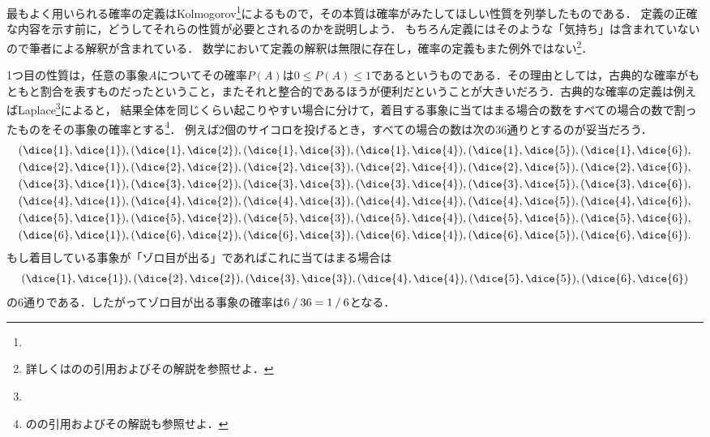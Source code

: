 \documentclass[main.tex]{subfiles}
\begin{document}
最もよく用いられる確率の定義はKolmogorov\footnote{%
}によるもので，その本質は確率がみたしてほしい性質を列挙したものである．
定義の正確な内容を示す前に，どうしてそれらの性質が必要とされるのかを説明しよう．
もちろん定義にはそのような「気持ち」は含まれていないので筆者による解釈が含まれている．
数学において定義の解釈は無限に存在し，確率の定義もまた例外ではない\footnote{%
詳しくはのの引用およびその解説を参照せよ．}．

1つ目の性質は，任意の事象\(A\)についてその確率\(P(A)\)は\(0 \leq P(A) \leq 1\)であるというものである．その理由としては，古典的な確率がもともと割合を表すものだったということ，またそれと整合的であるほうが便利だということが大きいだろう．古典的な確率の定義は例えばLaplace\footnote{%
}によると，
結果全体を同じくらい起こりやすい場合に分けて，着目する事象に当てはまる場合の数をすべての場合の数で割ったものをその事象の確率とする\footnote{%
のの引用およびその解説も参照せよ．}．
例えば2個のサイコロを投げるとき，すべての場合の数は次の36通りとするのが妥当だろう．
\begin{align*}
    & (\dice{1}, \dice{1}), (\dice{1}, \dice{2}), (\dice{1}, \dice{3}), (\dice{1}, \dice{4}), (\dice{1}, \dice{5}), (\dice{1}, \dice{6}), \\
    & (\dice{2}, \dice{1}), (\dice{2}, \dice{2}), (\dice{2}, \dice{3}), (\dice{2}, \dice{4}), (\dice{2}, \dice{5}), (\dice{2}, \dice{6}), \\
    & (\dice{3}, \dice{1}), (\dice{3}, \dice{2}), (\dice{3}, \dice{3}), (\dice{3}, \dice{4}), (\dice{3}, \dice{5}), (\dice{3}, \dice{6}), \\
    & (\dice{4}, \dice{1}), (\dice{4}, \dice{2}), (\dice{4}, \dice{3}), (\dice{4}, \dice{4}), (\dice{4}, \dice{5}), (\dice{4}, \dice{6}), \\
    & (\dice{5}, \dice{1}), (\dice{5}, \dice{2}), (\dice{5}, \dice{3}), (\dice{5}, \dice{4}), (\dice{5}, \dice{5}), (\dice{5}, \dice{6}), \\
    & (\dice{6}, \dice{1}), (\dice{6}, \dice{2}), (\dice{6}, \dice{3}), (\dice{6}, \dice{4}), (\dice{6}, \dice{5}), (\dice{6}, \dice{6}).
\end{align*}
もし着目している事象が「ゾロ目が出る」であればこれに当てはまる場合は
\begin{align*}
    (\dice{1}, \dice{1}), (\dice{2}, \dice{2}), (\dice{3}, \dice{3}), (\dice{4}, \dice{4}), (\dice{5}, \dice{5}), (\dice{6}, \dice{6})
\end{align*}
の6通りである．したがってゾロ目が出る事象の確率は\(6\mathbin{/}36 = 1\mathbin{/}6\)となる．
\end{document}
